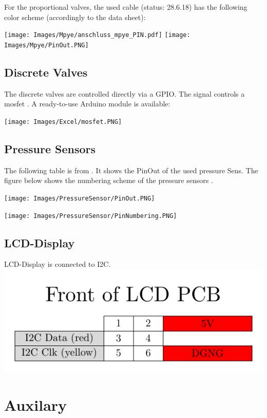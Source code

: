 \documentclass[
	fontsize=10pt
	paper=a4
]{scrartcl}
\begin{document}
For the proportional valves, the used cable (status: 28.6.18) has the following color scheme (accordingly to the data sheet\cite[p. 9]{MPYE_DATASHEET}):


\texttt{[image: Images/Mpye/anschluss\_mpye\_PIN.pdf]}
\texttt{[image: Images/Mpye/PinOut.PNG]}


\subsection{Discrete Valves}	
The discrete valves are controlled directly via a GPIO.
The signal controls a mosfet \cite{IRF540_DATASHEET}.
A ready-to-use Arduino module is available:

\texttt{[image: Images/Excel/mosfet.PNG]}



\subsection{Pressure Sensors}

The following table is from \cite[p. 30]{SSC_DATASHEET}. 
It shows the PinOut of the used pressure Sens.
The figure below shows the numbering scheme of the pressure sensors \cite[p. 19]{SSC_DATASHEET}.

\texttt{[image: Images/PressureSensor/PinOut.PNG]}

\texttt{[image: Images/PressureSensor/PinNumbering.PNG]}



\subsection{LCD-Display}

LCD-Display is connected to I2C.
\includegraphics[scale=1]{Images/LCDDisplay/LCDPins.pdf}



\section{Auxilary}
\end{document}
